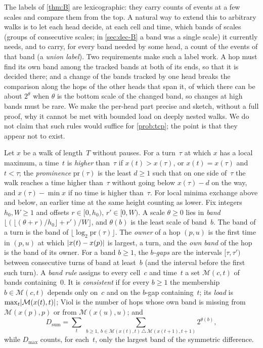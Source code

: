 The labels of \cref{thm:B} are lexicographic: they carry counts of events at a few scales and compare them from the
top. A natural way to extend this to arbitrary walks is to let each head decide, at each cell and time, which bands of
scales (groups of consecutive scales; in \cref{sec:dec-B} a band was a single scale) it currently needs, and to carry, for every band needed by some head, a count of the events of that band (a
\emph{union label}). Two requirements make such a label work. A hop must find its own band among the tracked bands at
both of its ends, so that it is decided there; and a change of the bands tracked by one head breaks the comparison
along the hops of the other heads that span it, of which there can be about $2^\theta$ when $\theta$ is the bottom
scale of the changed band, so changes at high bands must be rare. We make the per-head part precise and sketch, without a
full proof, why it cannot be met with bounded load on deeply nested walks. We do not claim that such rules would
suffice for \cref{prob:tcp}; the point is that they appear not to exist.

\begin{definition}\label{def:dep-band}
Let $x$ be a walk of length~$T$ without pauses. For a turn~$\tau$ at which $x$ has a local maximum, a time~$t$ is
\emph{higher} than~$\tau$ if $x(t)>x(\tau)$, or $x(t)=x(\tau)$ and $t<\tau$; the \emph{prominence} $\mathrm{pr}(\tau)$
is the least $d\ge1$ such that on one side of~$\tau$ the walk reaches a time higher than~$\tau$ without going below
$x(\tau)-d$ on the way, and $x(\tau)-\min x$ if no time is higher than~$\tau$. For local minima exchange above and
below, an earlier time at the same height counting as lower. Fix integers $h_0,W\ge1$ and offsets $r\in[0,h_0)$,
$r'\in[0,W)$. A scale $\theta\ge0$ lies in \emph{band} $\lfloor(\lfloor(\theta+r)/h_0\rfloor+r')/W\rfloor$, and
$\theta(b)$ is the least scale of band~$b$. The band of a turn is the band of $\lfloor\log_2\mathrm{pr}(\tau)\rfloor$.
The \emph{owner} of a hop $(p,u)$ is the first time in $(p,u)$ at which $\lvert x(t)-x(p) \rvert$ is largest, a turn, and the
\emph{own band} of the hop is the band of its owner. For a band $b\ge1$, the \emph{$b$-gaps} are the intervals
$[\tau,\tau')$ between consecutive turns of band at least~$b$ (and the interval before the first such turn). A
\emph{band rule} assigns to every cell~$c$ and time~$t$ a set $\mathcal M(c,t)$ of bands containing~$0$. It is
\emph{consistent} if for every $b\ge1$ the membership $b\in\mathcal M(c,t)$ depends only on~$c$ and on the $b$-gap
containing~$t$; its \emph{load} is $\max_t\lvert \mathcal M(x(t),t) \rvert$; $\mathrm{Viol}$ is the number of hops whose own
band is missing from $\mathcal M(x(p),p)$ or from $\mathcal M(x(u),u)$; and
\[
  D_{\mathrm{sum}}=\sum_{t}\;\sum_{b\ge1,\ b\in\mathcal M(x(t),t)\,\triangle\,\mathcal M(x(t+1),t+1)}2^{\theta(b)},
\]
while $D_{\max}$ counts, for each~$t$, only the largest band of the symmetric difference.
\end{definition}

